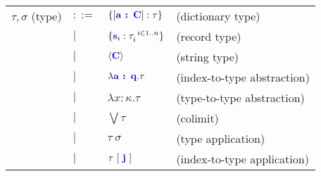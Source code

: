 \documentclass[sigplan,10pt,review,anonymous]{acmart}
\newcommand{\blu}[1]{\textbf{\color{blue}{#1}}}
\begin{document}
\begin{tabular}{llll}
$\tau,\sigma$ (type) & $::=$ & $\{[\blu{a : C}] : \tau \}$ & (dictionary type) \\ 
       & $\mid$ & $\{ \blu{s}_i : \tau_i^{~i \in 1..n} \}$ & (record type) \\
       & $\mid$ & $\langle \blu{C} \rangle$ & (string type) \\
       & $\mid$ & $\lambda \blu{a : q} . \tau$ & (index-to-type abstraction) \\
       & $\mid$ & $\lambda x : \kappa. \tau$ & (type-to-type abstraction) \\
       & $\mid$ & $\bigvee \tau$ & (colimit) \\
       & $\mid$ & $\tau~\sigma$ & (type application) \\
       & $\mid$ & $\tau~[~\blu{j}~]$ & (index-to-type application)
\end{tabular}

\fi 
\end{document}
